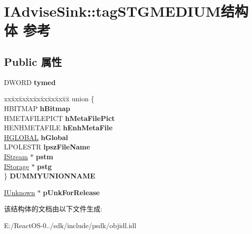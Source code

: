 \hypertarget{struct_i_advise_sink_1_1tag_s_t_g_m_e_d_i_u_m}{}\section{I\+Advise\+Sink\+:\+:tag\+S\+T\+G\+M\+E\+D\+I\+U\+M结构体 参考}
\label{struct_i_advise_sink_1_1tag_s_t_g_m_e_d_i_u_m}
\subsection*{Public 属性}
\begin{DoxyCompactItemize}
\item 
\mbox{\label{struct_i_advise_sink_1_1tag_s_t_g_m_e_d_i_u_m_ad8a1521a8cf3f6a89fe59c9be665bb18}} 
D\+W\+O\+RD {\bfseries tymed}
\item 
\mbox{\label{struct_i_advise_sink_1_1tag_s_t_g_m_e_d_i_u_m_afd456574fffe42de1ff014ccbf7accc4}} 
\begin{tabbing}
xx\=xx\=xx\=xx\=xx\=xx\=xx\=xx\=xx\=\kill
union \{\\
\>HBITMAP {\bfseries hBitmap}\\
\>HMETAFILEPICT {\bfseries hMetaFilePict}\\
\>HENHMETAFILE {\bfseries hEnhMetaFile}\\
\>\hyperlink{interfacevoid}{HGLOBAL} {\bfseries hGlobal}\\
\>LPOLESTR {\bfseries lpszFileName}\\
\>\hyperlink{interface_i_stream}{IStream} $\ast$ {\bfseries pstm}\\
\>\hyperlink{interface_i_storage}{IStorage} $\ast$ {\bfseries pstg}\\
\} {\bfseries DUMMYUNIONNAME}\\

\end{tabbing}\item 
\mbox{\label{struct_i_advise_sink_1_1tag_s_t_g_m_e_d_i_u_m_aa6e18245b61c817734d74258d87fd601}} 
\hyperlink{interface_i_unknown}{I\+Unknown} $\ast$ {\bfseries p\+Unk\+For\+Release}
\end{DoxyCompactItemize}


该结构体的文档由以下文件生成\+:\begin{DoxyCompactItemize}
\item 
E\+:/\+React\+O\+S-\/0../sdk/include/psdk/objidl.\+idl\end{DoxyCompactItemize}
